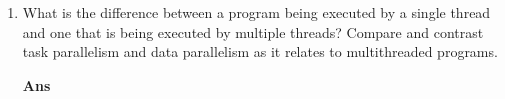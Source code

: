 \documentclass[paper=usletter, fontsize=12pt]{extarticle}
\begin{document}
\begin{enumerate}[label=\textbf{\arabic*}]
        \item What is the difference between a program being executed by a
        single thread and one that is being executed by multiple threads?
        Compare and contrast task parallelism and data parallelism as it
        relates to multithreaded programs.
        \item[\textbf{Ans}]
        \vspace{0.2in}

    \end{enumerate}
\end{document}
